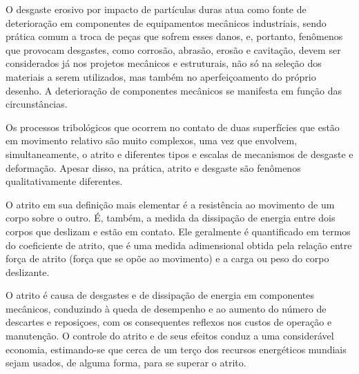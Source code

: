 O desgaste erosivo por impacto de partículas duras atua como fonte de
deterioração em componentes de equipamentos mecânicos industriais, sendo
prática comum a troca de peças que sofrem esses danos, e, portanto, fenômenos
que provocam desgastes, como corrosão, abrasão, erosão e cavitação, devem ser
considerados já nos projetos mecânicos e estruturais, não só na seleção dos
materiais a serem utilizados, mas também no aperfeiço\-amento do próprio
desenho.
A deterioração de componentes mecânicos se manifesta em função das
circunstâncias.

Os processos tribológicos que ocorrem no contato de duas superfícies que estão
em movimento relativo são muito complexos, uma vez que envolvem,
simultaneamente, o atrito e diferentes tipos e escalas de mecanismos de
desgaste e deformação. Apesar disso, na prática, atrito e desgaste são
fenômenos qualitativamente diferentes.

O atrito em sua definição mais elementar é a resistência ao movimento de um
corpo sobre o outro. É, também, a medida da dissipação de energia entre dois
corpos que deslizam e estão em contato. Ele geralmente é quantificado em termos
do coeficiente de atrito, que é uma medida adimensional obtida pela relação
entre força de atrito (força que se opõe ao movimento) e a carga ou peso do
corpo deslizante.

O atrito é causa de desgastes e de dissipação de energia em componentes
mecânicos, conduzindo à queda de desempenho e ao aumento do número de descartes
e reposiçoes, com os consequentes reflexos nos custos de operação e manutenção.
O controle do atrito e de seus efeitos conduz a uma considerável economia,
estimando-se que cerca de um terço dos recursos energéticos  mundiais sejam
usados, de alguma forma, para se superar o atrito.

